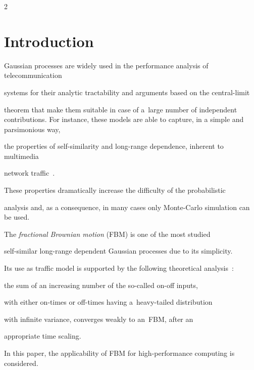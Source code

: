  \begin{multicols}{2}



 \label{st\stat}







\section{Introduction}



\vspace*{-4pt}



\noindent

Gaussian processes are widely used in the performance analysis of telecommunication 

systems for their analytic tractability and arguments based on the central-limit 

theorem that make them suitable in case of a~large number of independent contributions.  For instance, these  models are able to capture, in a simple and parsimonious way,

the properties of self-similarity and long-range dependence, inherent to multimedia

network traffic~\cite{2-luk-1, 3-luk-1}. 

These properties dramatically increase the difficulty of the probabilistic 

analysis and, as a consequence, in many cases only Monte-Carlo simulation can be used.

The \textit{fractional Brownian motion} (FBM) is one of the most studied 

self-similar long-range dependent Gaussian processes due to its simplicity. 

Its use as traffic model is supported  by the following theoretical analysis~\cite{4-luk-1}: 

the sum of an increasing  number of the so-called on-off inputs,

with either on-times or off-times having a~heavy-tailed distribution

with infinite variance, converges weakly to an~FBM, after an

appropriate time  scaling.





In this paper,  the applicability of FBM for high-performance computing is considered. 


\end{multicols}
